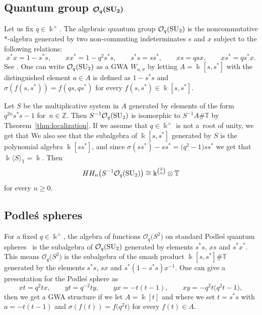 \documentclass[10pt,a4paper]{amsart}
\newcommand{\C}[1]{\mathcal{#1}}
\newcommand{\B}[1]{\mathbb{#1}}
\newcommand{\CH}{{\rm CH}}
\renewcommand{\geq}{\geqslant}
\numberwithin{equation}{section}
\begin{document}
\subsection[Quantum group CO\_q(SU\_2)]{Quantum group $\boldsymbol{\C{O}_q({\rm SU}_2)}$}\label{sect:OqSU2}

Let us fix $q\in\Bbbk^\times$. The algebraic quantum group $\C{O}_q({\rm SU}_2)$ is the
noncommutative $*$-algebra generated by two non-commuting indeterminates $s$ and $x$ subject
to the following relations:
\[%
 x^*x = 1 - s^*s, \qquad x x^* = 1 - q^2 s^*s, \qquad s^*s = s s^*,\qquad xs =
 qsx,\qquad xs^*=qs^*x.
\]
See \cite[p.~4]{Hadfield:Podles}. One can write $\C{O}_q({\rm SU}_2)$ as a GWA $W_{a,\sigma}$ by
letting $A=\Bbbk[s,s^*]$ with the distinguished element $a\in A$ is defined as $1-s^*s$ and
$\sigma(f(s,s^*))= f(qs,qs^*)$ for every $f(s,s^*)\in\Bbbk[s,s^*]$.

Let $S$ be the multiplicative system in $A$ generated by elements of the form $q^{2n}s^*s-1$ for~${n\in\B{Z}}$. Then $S^{-1}\C{O}_q({\rm SU}_2)$ is isomorphic to $S^{-1}A\# \B{T}$ by
Theorem~\ref{thm:localization}. If we assume that $q\in \Bbbk^\times$ is not a~root of unity, we get
that
\smash{$
 \CH_*\bigl(S^{-1}A\bigr)^{\B{T}} = \CH_*(\Bbbk) = \CH_*(A)_{\B{T}}
$}
We also see that the subalgebra of $\Bbbk[s,s^*]$ generated by $S$ is the polynomial algebra
$\Bbbk[ss^*]$, and since $\sigma(ss^*)-ss^* = \bigl(q^2-1\bigr)ss^*$ we get that
$\Bbbk\langle S\rangle_{\B{T}} = \Bbbk$. Then
\[
 HH_n\bigl(S^{-1}\C{O}_q({\rm SU}_2)\bigr) \cong \Bbbk^{\binom{2}{n}}\otimes\B{T}
\]
for every $n\geq 0$.

\subsection{Podle\'s spheres}\label{sect:PodlesSphere}

For a fixed $q\in\Bbbk^\times$, the algebra of functions $\C{O}_q\bigl(S^2\bigr)$ on standard Podle\'s
quantum spheres~\cite{Hadfield:Podles,Podl87} is the subalgebra of $\C{O}_q({\rm SU}_2)$
generated by elements $s^*s$, $xs$ and $s^*x^*$. This means $\C{O}_q\bigl(S^2\bigr)$ is the
subalgebra of the smash product $\Bbbk[s,s^*]\# \B{T}$ generated by the elements $s^*s$,
$sx$ and $s^*(1-s^*s)x^{-1}$. One can give a presentation for the Podle\'s sphere as
\[%
xt = q^2tx, \qquad yt = q^{-2} ty, \qquad yx = -t(t-1), \qquad xy =
-q^2t\bigl(q^2t-1\bigr),
\]
 then we get a GWA structure if we let $A = \Bbbk[t]$ and where we set
$t=s^*s$ with $a=-t(t-1)$ and $\sigma(f(t)) = f\bigl(q^2 t\bigr)$ for every $f(t)\in A$.
\end{document}

